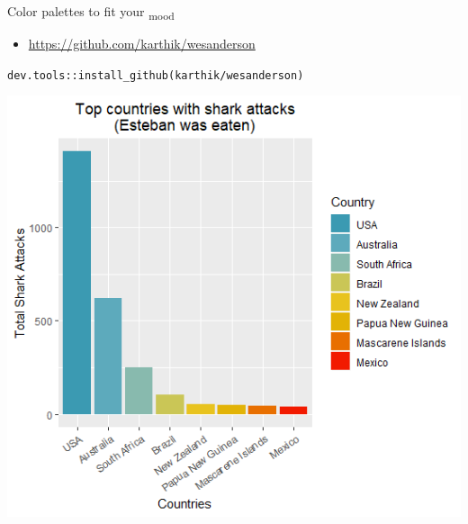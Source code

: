 \documentclass[
  ignorenonframetext,
]{beamer}
\providecommand{\tightlist}{%
  \setlength{\itemsep}{0pt}\setlength{\parskip}{0pt}}
\begin{document}
\begin{frame}[fragile]{Color palettes to fit your \textsubscript{mood}}
\protect\hypertarget{color-palettes-to-fit-your-mood}{}

\begin{itemize}
\tightlist
\item
  \url{https://github.com/karthik/wesanderson}
\end{itemize}

\texttt{dev.tools::install\_github(karthik/wesanderson)}

\includegraphics{../external/images/funR_3_wes_anderson.png}

\end{frame}
\end{document}
